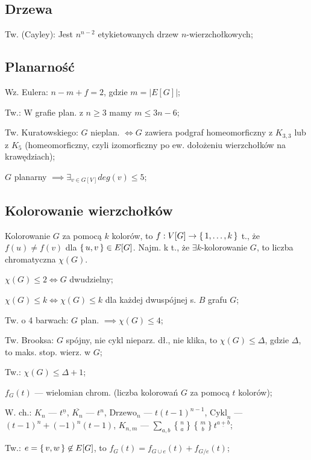 \subsection{Drzewa}

Tw. (Cayley): Jest $n^{n-2}$ etykietowanych drzew $n$-wierzchołkowych;

\subsection{Planarność}

Wz. Eulera: $n - m + f = 2$, gdzie $m = |E[G]|$;

Tw.: W grafie plan. z $n \geq 3$ mamy $m \leq 3n -6$;

Tw. Kuratowskiego: $G$ nieplan. $\iff G$ zawiera podgraf homeomorficzny
  z $K_{3,3}$ lub z $K_5$ (homeomorficzny, czyli
  izomorficzny po ew. dołożeniu wierzchołków na krawędziach);

$G$ planarny $\implies \exists_{v \in G[V]} deg(v) \leq 5$;

\subsection{Kolorowanie wierzchołków}

Kolorowanie $G$ za pomocą $k$ kolorów, to
  $f: V[G] \rightarrow \set{1, \dots, k}$ t., że $f(u) \neq f(v)$ dla
  $\set{u, v} \in E[G]$. Najm. k t., że $\exists k$-kolorowanie $G$, to liczba
  chromatyczna $\chi (G)$.

$\chi(G) \leq 2 \Leftrightarrow G$ dwudzielny;

$\chi(G) \leq k \Leftrightarrow \chi(G) \leq k$ dla każdej dwuspójnej s. $B$
  grafu $G$;

Tw. o 4 barwach: $G$ plan. $\implies\chi(G)\leq 4$;

Tw. Brooksa: $G$ spójny, nie cykl nieparz. dł., nie klika, to
  $\chi(G) \leq \Delta$, gdzie $\Delta$, to maks. stop. wierz. w $G$;

Tw.: $\chi(G) \leq \Delta + 1$;

$f_G(t)$ --- wielomian chrom. (liczba kolorowań $G$ za pomocą $t$ kolorów);

W. ch.:
$K_n$ --- $t^{\underline{n}}$,
$\overline{K_n}$ --- $t^n$,
$\text{Drzewo}_n$ --- $t(t-1)^{n-1}$,
$\text{Cykl}_n$ --- $(t-1)^n + (-1)^n(t-1)$,
$K_{n,m}$ --- $\sum_{a,b}{n \brace a}{m \brace b}t^{\underline{a+b}}$;

Tw.: $e = \set{v, w} \not\in E[G]$, to $f_G(t)=f_{G\cup e}(t) + f_{G/e}(t)$;

